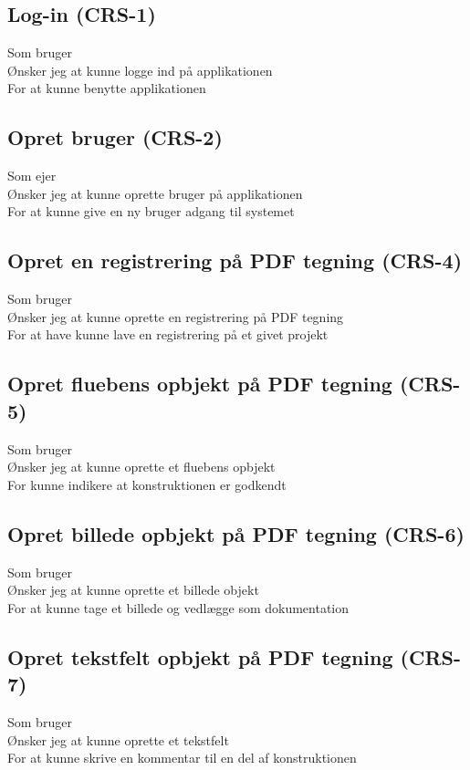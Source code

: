 	\subsection*{Log-in (CRS-1)}
	Som bruger\\
	Ønsker jeg at kunne logge ind på applikationen\\
	For at kunne benytte applikationen
	
	\subsection*{Opret bruger (CRS-2)}
	Som ejer\\
	Ønsker jeg at kunne oprette bruger på applikationen\\
	For at kunne give en ny bruger adgang til systemet
	
	\subsection*{Opret en registrering på PDF tegning (CRS-4)}
	Som bruger\\
	Ønsker jeg at kunne oprette en registrering på PDF tegning\\
	For at have kunne lave en registrering på et givet projekt 
	
	\subsection*{Opret fluebens opbjekt på PDF tegning (CRS-5)}
	Som bruger \\
	Ønsker jeg at kunne oprette et fluebens opbjekt\\
	For kunne indikere at konstruktionen er godkendt 

	\subsection*{Opret billede opbjekt på PDF tegning (CRS-6)}
	Som bruger\\
	Ønsker jeg at kunne oprette et billede objekt\\
	For at kunne tage et billede og vedlægge som dokumentation 
	
	\subsection*{Opret tekstfelt opbjekt på PDF tegning (CRS-7)}
	Som bruger\\
	Ønsker jeg at kunne oprette et tekstfelt\\
	For at kunne skrive en kommentar til en del af konstruktionen 
	
